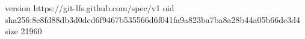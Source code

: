 version https://git-lfs.github.com/spec/v1
oid sha256:8c8fd88db3d0dcd6f9467b535566d6f041fa9a823ba7ba8a28b44a05b66de3d4
size 21960
